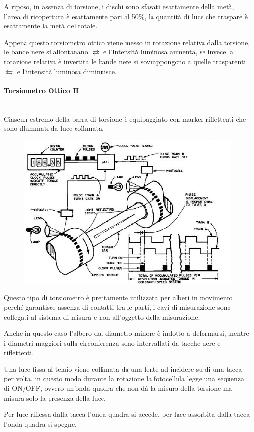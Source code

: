 \documentclass[a4paper, 15pt]{article}
\begin{document}
\begin{adjustwidth}{2in}{}
  		A riposo, in assenza di torsione, i dischi sono sfasati esattamente della metà, l'area di ricopertura è esattamente pari al 50\%, la quantità di luce che traspare è esattamente la metà del totale. 
  		
  		Appena questo torsiometro ottico viene messo in rotazione relativa dalla torsione, le bande nere si allontanano $ \rightleftarrows $ e l'intensità luminosa  aumenta, se invece la rotazione relativa è invertita le bande nere si sovrappongono a quelle trasparenti $ \leftrightarrows $ e l'intensità luminosa diminuisce.  
  		
\paragraph{Torsiometro Ottico II}\mbox{} \\ 
  		Ciascun estremo della barra di torsione è equipaggiato con marker riflettenti
  		che sono illuminati da luce collimata.
\begin{figure}[H]
	\centering
	\includegraphics[width=0.5\linewidth]{immagini/22}
	\label{fig:22}
\end{figure}
  		Questo tipo di torsiometro è prettamente utilizzata per alberi in movimento perché garantisce assenza di contatti tra le parti, i cavi di misurazione sono collegati al sistema di misura e non all'oggetto della misurazione. \newline 
  		
  		Anche in questo caso l'albero dal diametro minore è indotto a deformarsi, mentre i diametri maggiori sulla circonferenza sono intervallati da tacche nere e riflettenti. \newline 
  		
  		Una luce fissa al telaio viene collimata da una lente ad incidere su di una tacca per volta, in questo modo durante la rotazione la fotocellula legge una sequenza di ON/OFF, ovvero un'onda quadra che non dà la misura della torsione ma misura solo la presenza della luce. 
  		
  		Per luce riflessa dalla tacca l'onda quadra si accede, per luce assorbita dalla tacca l'onda quadra si spegne. \newline 
  		

\end{adjustwidth}
\end{document}
